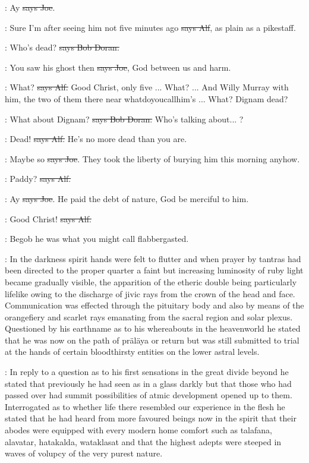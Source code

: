 \joe:
Ay \sout{says Joe}.

\bergan:
Sure I'm after seeing him not five minutes ago
\sout{says Alf}, as plain as a pikestaff.

\doran:
Who's dead? \sout{says Bob Doran.}

\joe:
You saw his ghost then \sout{says Joe},
God between us and harm.

\bergan:
What? \sout{says Alf.} Good Christ, only five ...
What? ... And Willy Murray
with him, the two of them there near whatdoyoucallhim's ... What?
Dignam dead?

\doran:
What about Dignam? \sout{says Bob Doran.}
Who's talking about... ?

\bergan:
Dead! \sout{says Alf.}
He's no more dead than you are.

\joe:
Maybe so \sout{says Joe}.
They took the liberty of burying him this morning
anyhow.

\bergan:
Paddy? \sout{says Alf.}

\joe:
Ay \sout{says Joe}.
He paid the debt of nature, God be merciful to him.

\bergan:
Good Christ! \sout{says Alf.}

\Nq:
Begob he was what you might call flabbergasted.

:
In the darkness spirit hands were felt to flutter and when prayer by
tantras had been directed to the proper quarter a faint but increasing
luminosity of ruby light became gradually visible,
the apparition of the
etheric double being particularly lifelike owing to the discharge of jivic
rays from the crown of the head and face. Communication was effected
through the pituitary body and also by means of the orangefiery and
scarlet rays emanating from the sacral region and solar plexus. Questioned
by his earthname as to his whereabouts in the heavenworld he stated that
he was now on the path of präläya or return but was still submitted to
trial at the hands of certain bloodthirsty entities on the lower astral
levels.

:
In reply to a question as to his first sensations in the great
divide beyond he stated that previously he had seen as in a glass darkly
but that those who had passed over
had summit possibilities of atmic
development opened up to them. Interrogated as to whether life there
resembled our experience in the flesh he stated that he had heard from
more favoured beings now in the spirit that their abodes were equipped
with every modern home comfort such as talafana, alavatar, hatakalda,
wataklasat and that the highest adepts were steeped in waves of volupcy
of the very purest nature.

